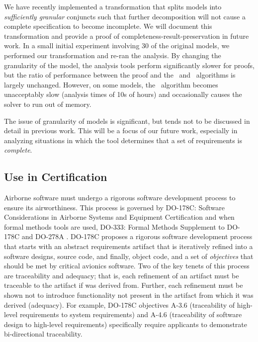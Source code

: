 %
We have recently implemented a transformation that splits models into {\em sufficiently granular} conjuncts such that further decomposition will not cause a complete specification to become incomplete.  We will document this transformation and provide a proof of completeness-result-preservation in future work.
%
In a small initial experiment involving 30 of the original models, we performed our transformation and re-ran the analysis.  By changing the granularity of the model, the analysis tools perform significantly slower for proofs, but the ratio of performance between the proof and the \ucalg\ and \mustalg\ algorithms is largely unchanged.  However, on some models, the \mustalg\ algorithm becomes unacceptably slow (analysis times of 10s of hours) and occasionally causes the solver to run out of memory.

The issue of granularity of models is significant, but tends not to be discussed in detail in previous work.  This will be a focus of our future work, especially in analyzing situations in which the tool determines that a set of requirements is {\em complete}.

\subsection{Use in Certification}
Airborne software must undergo a rigorous software development process to ensure its airworthiness. This process is governed by DO-178C: Software Considerations in Airborne Systems and Equipment Certification \cite{DO178C} and when formal methods tools are used, DO-333: Formal Methods Supplement to DO-178C and DO-278A \cite{DO333}. DO-178C proposes a rigorous software development process that starts with an abstract requirements artifact that is iteratively refined into a software designs, source code, and finally, object code, and a set of {\em objectives} that should be met by critical avionics software.  Two of the key tenets of this process are traceability and adequacy; that is, each refinement of an artifact must be traceable to the artifact if was derived from. Further, each refinement must be shown not to introduce functionality not present in the artifact from which it was derived (adequacy). For example, DO-178C objectives A-3.6 (traceability of high-level requirements to system requirements) and A-4.6 (traceability of software design to high-level requirements) specifically require applicants to demonstrate bi-directional traceability.


